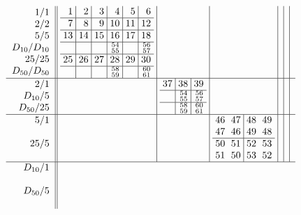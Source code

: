 \documentclass[11pt,a4paper]{amsart}
\begin{document}
\small
\begin{align*}\arraycolsep3pt
  \begin{array}{r||c|c|c|c|c|c}
  \begin{array}{r}
1/1\\2/2\\5/5\\D_{10}/D_{10}\\25/25\\D_{50}/D_{50}\\
  \end{array}
   &
\begin{array}{r|r|r|r|r|r}
1&2&3&4&5&6\\ \hline
7&8&9&10&11&12\\ \hline
13&14&15&16&17&18\\ \hline
&&&^{54}_{55}&&^{56}_{57}\\ \hline
25&26&27&28&29&30\\ \hline
&&&^{58}_{59}&&^{60}_{61}
\end{array}
&&&&& \\ \hline
    \begin{array}{r}
2/1\\D_{10}/5\\D_{50}/25\\
    \end{array}
    &&
\begin{array}{r|r|r}%
37&38&39\\ \hline
&^{54}_{55}&^{56}_{57}\\ \hline
&^{58}_{59}&^{60}_{61}
\end{array}
&&&& \\ \hline
    \begin{array}{r}
5/1\\ \\25/5\\ \\
    \end{array}
    &&&
\begin{array}{rr|rr}%
46&47&48&49\\
47&46&49&48\\ \hline
50&51&52&53\\
51&50&53&52
\end{array}%
&&& \\ \hline
    \begin{array}{r}
D_{10}/1\\ \\D_{50}/5\\ \\

\end{array}
\end{array}
\end{align*}
\end{document}
